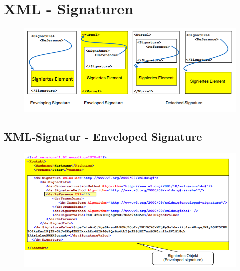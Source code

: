 \section{XML - Signaturen}
\begin{figure}[H]
	\begin{center}
		\includegraphics[scale=0.8]{Resources/XMLSig}
		\caption{}
		\label{fig:XMLSig}
	\end{center}
\end{figure}

\subsection{XML-Signatur - Enveloped Signature}
\begin{figure}[H]
	\begin{center}
		\includegraphics[scale=0.8]{Resources/EnvelopedSignature}
		\caption{}
		\label{fig:EvelopedSignature}
	\end{center}
\end{figure}

